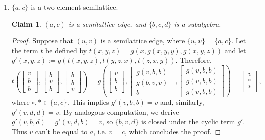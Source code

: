 \documentclass[11pt]{amsart}
\theoremstyle{definition}
\theoremstyle{remark}
\theoremstyle{plain}
\newtheorem{claim}[thm]{Claim}
\begin{document}
\begin{enumerate}[wide, labelindent=0pt]
    \item[\textsc{\textbf{Case 1.}}] $\{a,c\}$ is a two-element semilattice.
\begin{claim}\label{Cl62}
$(a,c)$ is a semilattice edge, and $\{b,c,d\}$ is a subalgebra.
\end{claim}

\begin{proof}
 Suppose that $(u,v)$ is a semilattice edge, where $\{u,v\}=\{a,c\}$. Let the term $t$ be defined by $t(x,y,z)=g(x,g(x,y,y),g(x,y,z))$ and let $g'(x,y,z):=g(t(x,y,z),t(y,z,x),t(z,x,y))$. Therefore,
 $$
t\left(
\begin{bmatrix}
v \\
b \\
b
\end{bmatrix}\!,\!
\begin{bmatrix}
b \\
v \\
b
\end{bmatrix}\!,\!
\begin{bmatrix}
b \\
b \\
v
\end{bmatrix}
\right)=g\left(
\begin{bmatrix}
v \\
b \\
b
\end{bmatrix}\!,\!
\begin{bmatrix}
g(v,b,b) \\
g(b,v,v) \\
b
\end{bmatrix}\!,\!
\begin{bmatrix}
g(v,b,b) \\
g(v,b,b)\\
g(v,b,b)
\end{bmatrix}
\right)=
\begin{bmatrix}
v \\
\circ \\
\ast
\end{bmatrix},
$$ where $\circ,\ast\in \{a,c\}$. This implies $g'(v,b,b)=v$ and, similarly, $g'(v,d,d)=v$. By analogous computation, we derive $g'(v,b,d)=g'(v,d,b)=v$, so $\{b,v,d\}$ is closed under the cyclic term $g'$. Thus $v$ can't be equal to $a$, i.e. $v=c$, which concludes the proof.
\end{proof}


\end{enumerate}
\end{document}
